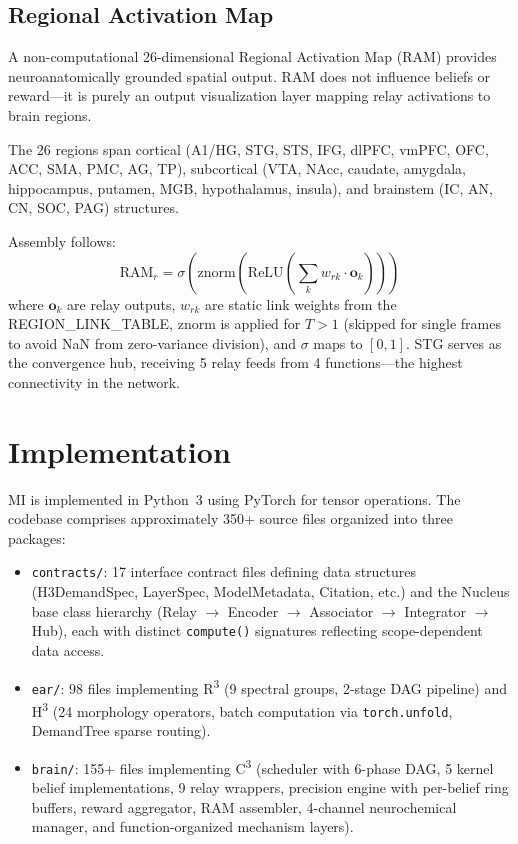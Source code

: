\documentclass[10pt,twocolumn]{article}
\newcommand{\Rcube}{R\textsuperscript{3}}
\newcommand{\Hcube}{H\textsuperscript{3}}
\newcommand{\Ccube}{C\textsuperscript{3}}
\begin{document}
\subsection{Regional Activation Map}
\label{sec:ram}

A non-computational 26-dimensional Regional Activation Map (RAM) provides neuroanatomically grounded spatial output.
RAM does not influence beliefs or reward---it is purely an output visualization layer mapping relay activations to brain regions.

The 26 regions span cortical (A1/HG, STG, STS, IFG, dlPFC, vmPFC, OFC, ACC, SMA, PMC, AG, TP), subcortical (VTA, NAcc, caudate, amygdala, hippocampus, putamen, MGB, hypothalamus, insula), and brainstem (IC, AN, CN, SOC, PAG) structures.

Assembly follows:
\begin{equation}
\text{RAM}_r = \sigma\!\left(\text{znorm}\!\left(\text{ReLU}\!\left(\sum_k w_{rk} \cdot \mathbf{o}_k\right)\right)\right)
\end{equation}
where $\mathbf{o}_k$ are relay outputs, $w_{rk}$ are static link weights from the REGION\_LINK\_TABLE, znorm is applied for $T > 1$ (skipped for single frames to avoid NaN from zero-variance division), and $\sigma$ maps to $[0, 1]$.
STG serves as the convergence hub, receiving 5 relay feeds from 4 functions---the highest connectivity in the network.

\section{Implementation}
\label{sec:implementation}

MI is implemented in Python~3 using PyTorch for tensor operations.
The codebase comprises approximately 350+ source files organized into three packages:

\begin{itemize}[leftmargin=*,nosep]
    \item \texttt{contracts/}: 17 interface contract files defining data structures (H3DemandSpec, LayerSpec, ModelMetadata, Citation, etc.) and the Nucleus base class hierarchy (Relay $\rightarrow$ Encoder $\rightarrow$ Associator $\rightarrow$ Integrator $\rightarrow$ Hub), each with distinct \texttt{compute()} signatures reflecting scope-dependent data access.
    \item \texttt{ear/}: 98 files implementing \Rcube{} (9 spectral groups, 2-stage DAG pipeline) and \Hcube{} (24 morphology operators, batch computation via \texttt{torch.unfold}, DemandTree sparse routing).
    \item \texttt{brain/}: 155+ files implementing \Ccube{} (scheduler with 6-phase DAG, 5 kernel belief implementations, 9 relay wrappers, precision engine with per-belief ring buffers, reward aggregator, RAM assembler, 4-channel neurochemical manager, and function-organized mechanism layers).
\end{itemize}
\end{document}
